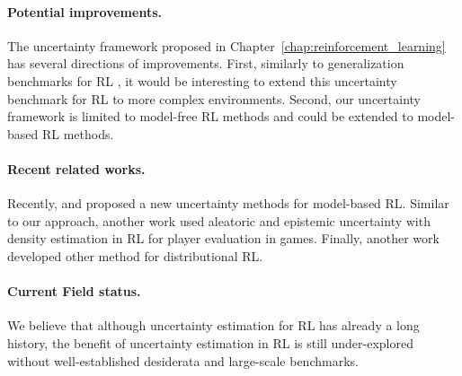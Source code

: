 \paragraph{Potential improvements.} The uncertainty framework proposed in Chapter~\ref{chap:reinforcement_learning} has several directions of improvements. First, similarly to generalization benchmarks for RL \cite{generalization-rl-survey, assessing-generalization-rl, procgen}, it would be interesting to extend this uncertainty benchmark for RL to more complex environments. Second, our uncertainty framework is limited to model-free RL methods and could be extended to model-based RL methods. 

\paragraph{Recent related works.} Recently, \cite{tennenholtz2022plan} and \cite{wu2022plan} proposed a new uncertainty methods for model-based RL. Similar to our approach, another work \cite{liu2022uncertaintyaware} used aleatoric and epistemic uncertainty with density estimation  in RL for player evaluation in games. Finally, another work \cite{luo2022distributional} developed other method for distributional RL.

\paragraph{Current Field status.} We believe that although uncertainty estimation for RL has already a long history, the benefit of uncertainty estimation in RL is still under-explored without well-established desiderata and large-scale benchmarks.